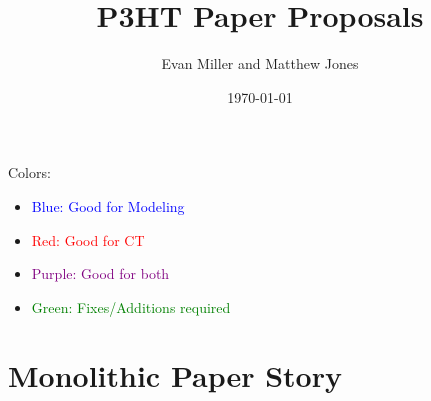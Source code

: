 \documentclass[12pt]{article}
\title{P3HT Paper Proposals}
\author{Evan Miller and Matthew Jones}
\date{\today}
\begin{document}
\maketitle

Colors:
\begin{itemize}
    \item{\textcolor{blue}{Blue: Good for Modeling}}
    \item{\textcolor{red}{Red: Good for CT}}
    \item{\textcolor{purple}{Purple: Good for both}}
    \item{\textcolor{green}{Green: Fixes/Additions required}}
\end{itemize}


\section{Monolithic Paper Story}
\end{document}
